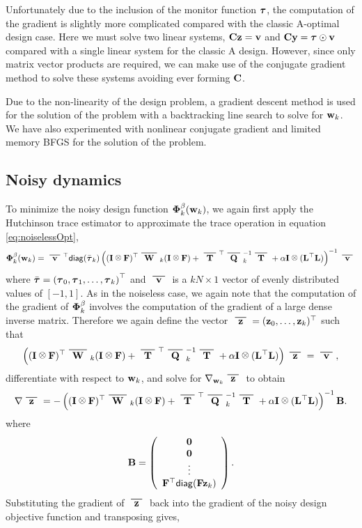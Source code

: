 \documentclass[11pt]{article}
\begin{document}
Unfortunately due to the inclusion of the monitor function ${\boldsymbol \tau}$, the computation of the gradient
is slightly more complicated compared with  the classic A-optimal design case. Here  we must solve two linear systems, ${\bf{C}}{\bf{z}} = {\bf{v}}$ and ${\bf{C}}{\bf{y}} = {\boldsymbol \tau}\odot{\bf{v}}$ compared with a single linear system for the classic A design. However, since only matrix vector products are required, we can make use of the conjugate gradient method to solve these systems avoiding ever forming ${\bf{C}}$. 

Due to the non-linearity of the design problem, a gradient descent method is used for the solution
of the problem with a backtracking line search to solve for ${\bf{w}}_k$.
We have also experimented with nonlinear conjugate gradient and limited memory BFGS for the solution
of the problem.

\subsection{Noisy dynamics}
To minimize the noisy design function ${\boldsymbol \Phi}_k^{\beta}({\bf{w}}_k)$, we again first apply the Hutchinson trace estimator to approximate the trace operation in equation \eqref{eq:noiselessOpt},
 \begin{equation}
\bfPhi_k^{\beta}(\bfw_k) =\vbar^{\top }{\sf diag}(\bar{\bftau}_{k}) \left((\bfI \kronecker \bfF)^{\top}\Wbar_k(\bfI \kronecker \bfF)  +
\Tbar^{\top}\Qbar^{-1}_k\Tbar + \alpha \bfI \kronecker(\LtL)
\right)^{-1}\vbar
\end{equation} 
where $\bar{{\boldsymbol \tau}} = \left({\boldsymbol \tau}_0,
{\boldsymbol \tau}_1 ,
\hdots,
{\boldsymbol \tau}_k\right)^{\top}$ and  $\vbar$ is a $kN \times 1$ vector of evenly distributed values of $[-1,1]$. 
As in the noiseless case, we again note that the computation of the gradient of ${\boldsymbol \Phi}_k^{\beta}$ involves the computation of the gradient of a large dense inverse matrix. Therefore we again define the vector $\zbar = (\bfz_0,\hdots,\bfz_k)^{\top}$  such that 
 \begin{equation}
 \left((\bfI \kronecker \bfF)^{\top}\Wbar_k(\bfI \kronecker \bfF)  +
\Tbar^{\top}\Qbar^{-1}_k\Tbar + \alpha \bfI \kronecker(\LtL)
\right)\zbar = \vbar,
\end{equation} 
differentiate with respect to ${\bf{w}}_k$, and solve for $\nabla_{\bfw_k}\zbar$ to obtain
\begin{equation}
\nabla\zbar =-\left( (\bfI \kronecker \bfF)^{\top}\Wbar_k(\bfI \kronecker \bfF)  + 
\Tbar^{\top}\Qbar^{-1}_k\Tbar + \alpha \bfI \kronecker(\LtL) \right)^{-1}\bfB.
\end{equation}
where 
\begin{equation}
{\bf{B}} =  \left(\begin{array}{c} {\bf 0} \\ {\bf 0}\\ \vdots\\ {\bf{F}}^{\top}{\sf diag}({\bf{F}}{\bf{z}}_k) \end{array}\right).
\end{equation}
Substituting the gradient of $\zbar $ back into the gradient of the noisy design objective function and transposing gives,
\end{document}
